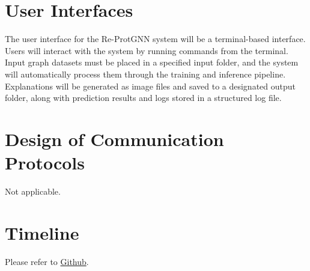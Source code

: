 \documentclass[12pt, titlepage]{article}
\begin{document}

\section{User Interfaces}

The user interface for the Re-ProtGNN system will be a terminal-based interface. Users will interact with the system by running commands from the terminal. Input graph datasets must be placed in a specified input folder, and the system will automatically process them through the training and inference pipeline. Explanations will be generated as image files and saved to a designated output folder, along with prediction results and logs stored in a structured log file.

\section{Design of Communication Protocols}

Not applicable.

\section{Timeline}

Please refer to \href{https://github.com/Yuanqi-X/Re-ProtGNN/tree/main}{Github}.




\newpage{}
\end{document}
